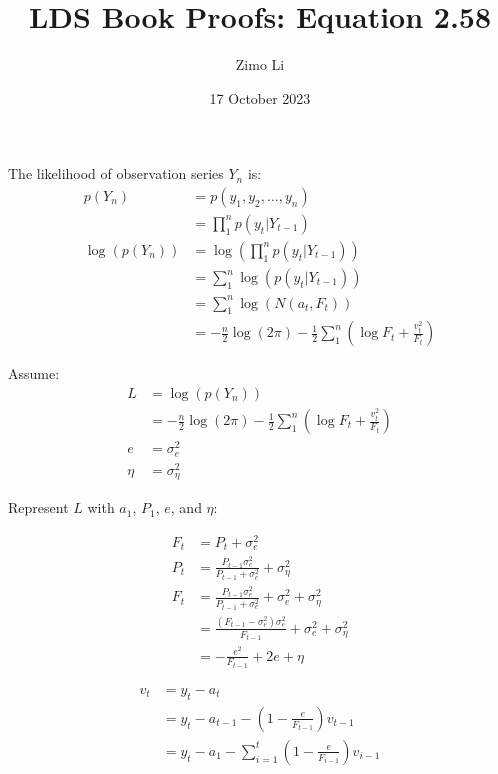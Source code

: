 \documentclass{article}
\title{LDS Book Proofs: Equation 2.58}
\author{Zimo Li}
\date{17 October 2023}
\begin{document}
\maketitle

\par\noindent
The likelihood of observation series \(Y_n\) is:
\begin{align*}
    p(Y_n) &= p(y_1, y_2, \hdots, y_n)\\ 
    &= \prod_{1}^{n}p(y_t|Y_{t-1})\\
    \log(p(Y_n)) &= \log(\prod_{1}^{n}p(y_t|Y_{t-1}))\\
    &= \sum_{1}^{n}\log(p(y_t|Y_{t-1}))\\
    &= \sum_{1}^{n}\log(N(a_t, F_t))\\
    &= -\frac{n}{2}\log(2\pi)-\frac{1}{2}\sum_{1}^{n}(\log{F_t}+\frac{v_t^2}{F_t})
\end{align*}

\par\noindent
Assume:
\begin{align*}
    L &= \log(p(Y_n))\\
    &= -\frac{n}{2}\log(2\pi)-\frac{1}{2}\sum_{1}^{n}(\log{F_t}+\frac{v_t^2}{F_t})\\
    e &= \sigma^2_e\\
    \eta &= \sigma^2_\eta
\end{align*}

\par\noindent
Represent \(L\) with \(a_1\), \(P_1\), \(e\), and \(\eta\):
\par\noindent
\begin{minipage}[t]{0.4\textwidth}
    \begin{align*}
        F_t &= P_t + \sigma^2_e\\
        P_t &= \frac{P_{t-1}\sigma^2_e}{P_{t-1} + \sigma^2_e} + \sigma^2_\eta\\
        F_t &= \frac{P_{t-1}\sigma^2_e}{P_{t-1} + \sigma^2_e} + \sigma^2_e + \sigma^2_\eta\\
        &= \frac{(F_{t-1}-\sigma^2_e)\sigma^2_e}{F_{t-1}} + \sigma^2_e + \sigma^2_\eta\\
        &= -\frac{e^2}{F_{t-1}} +2e+\eta
    \end{align*}
\end{minipage}
\hfill
\begin{minipage}[t]{0.4\textwidth}
    \begin{align*}
        v_t &= y_t-a_t\\
        &= y_t - a_{t-1} - (1-\frac{e}{F_{t-1}})v_{t-1}\\
        &= y_t - a_1 - \sum_{i=1}^{t}(1-\frac{e}{F_{i-1}})v_{i-1}
    \end{align*}
\end{minipage}\\
\end{document}
